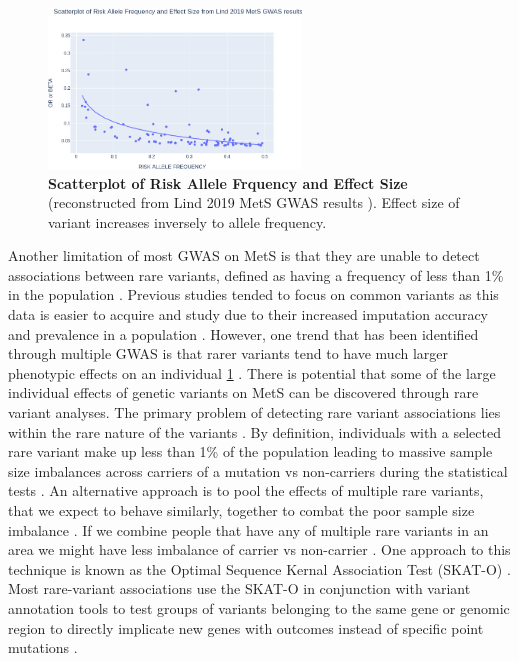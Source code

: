 \documentclass[11pt]{article}
\begin{document}
\begin{figure}
  \begin{center}
    \includegraphics[width=0.60\textwidth]{"images/fig1v2.png"}
  \end{center}
  \caption{\textbf{Scatterplot of Risk Allele Frquency and Effect Size} (reconstructed from Lind 2019 MetS GWAS results \cite{pmid31589552}). Effect size of variant increases inversely to allele frequency.}
  \label{fig:f1}
\end{figure}

Another limitation of most GWAS on MetS is that they are unable to detect associations between rare variants, defined as having a frequency of less than 1\% in the population \cite{pmid29480368}. Previous studies tended to focus on common variants as this data is easier to acquire and study due to their increased imputation accuracy and prevalence in a population \cite{Uffelmann2021}. However, one trend that has been identified through multiple GWAS is that rarer variants tend to have much larger phenotypic effects on an individual \ref{fig:f1} \cite{Uffelmann2021,pmid31589552}. There is potential that some of the large individual effects of genetic variants on MetS can be discovered through rare variant analyses. The primary problem of detecting rare variant associations lies within the rare nature of the variants \cite{Lee2018}. By definition, individuals with a selected rare variant make up less than 1\% of the population leading to massive sample size imbalances across carriers of a mutation vs non-carriers during the statistical tests \cite{Lee2018}. An alternative approach is to pool the effects of multiple rare variants, that we expect to behave similarly, together to combat the poor sample size imbalance \cite{pmid22863193}. If we combine people that have any of multiple rare variants in an area we might have less imbalance of carrier vs non-carrier \cite{pmid22863193}. One approach to this technique is known as the Optimal Sequence Kernal Association Test (SKAT-O) \cite{pmid22863193}. Most rare-variant associations use the SKAT-O in conjunction with variant annotation tools to test groups of variants belonging to the same gene or genomic region to directly implicate new genes with outcomes instead of specific point mutations \cite{Zhou2022,KARCZEWSKI2022100168}. 
\end{document}
